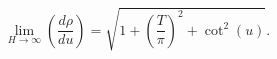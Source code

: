 \begin{equation}
  \lim_{H\to\infty}\left(\frac{d \rho}{du}\right)  
  = \sqrt{1+\left(\frac{T}{\pi}\right)^2+\cot^2(u)}.
\end{equation}

